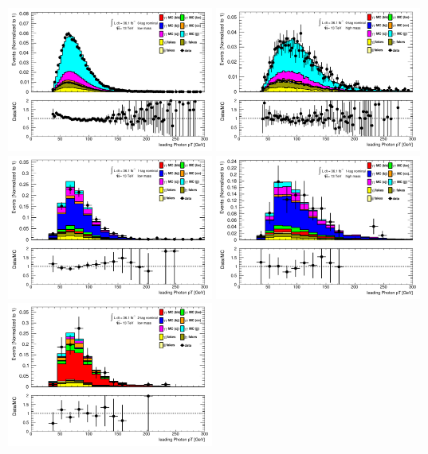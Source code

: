 \begin{figure}[p]
  \centering
  \includegraphics[width=0.48\textwidth]{chapters/chapter5_yybb/images/data_MC_comparison/h_CR_l_0t_nominal_leadingPhoton_pt.pdf}
  \includegraphics[width=0.48\textwidth]{chapters/chapter5_yybb/images/data_MC_comparison/h_CR_h_0t_nominal_leadingPhoton_pt.pdf}
  \includegraphics[width=0.48\textwidth]{chapters/chapter5_yybb/images/data_MC_comparison/h_SR_l_1t_nominal_leadingPhoton_pt.pdf}
  \includegraphics[width=0.48\textwidth]{chapters/chapter5_yybb/images/data_MC_comparison/h_SR_h_1t_nominal_leadingPhoton_pt.pdf}
  \includegraphics[width=0.48\textwidth]{chapters/chapter5_yybb/images/data_MC_comparison/h_SR_l_2t_nominal_leadingPhoton_pt.pdf}

\end{figure}
